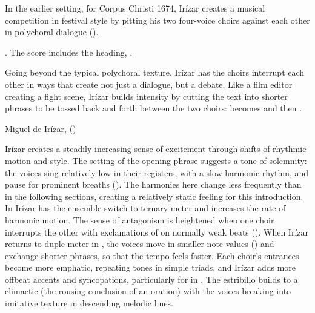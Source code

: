 In the earlier setting, for Corpus Christi 1674, Irízar creates a musical
competition in festival style by pitting his two four-voice choirs against each
other in polychoral dialogue ().%
\begin{Footnote}
    \Autocite[133--148]{Cashner:WLSCM32}.  
    The score includes the heading, .
\end{Footnote}
Going beyond the typical polychoral texture, Irízar has the choirs interrupt
each other in ways that create not just a dialogue, but a debate.
Like a film editor creating a fight scene, Irízar builds intensity by cutting
the text into shorter phrases to be tossed back and forth between the two
choirs:  becomes  and then
.


\begin{musicexample}
    \caption{Miguel de Irízar,  ()}
    \label{mus:Irizar-Si_los_sentidos}
\end{musicexample}

Irízar creates a steadily increasing sense of excitement through shifts of
rhythmic motion and style.
The setting of the opening phrase suggests a tone of solemnity: the voices sing
relatively low in their registers, with a slow harmonic rhythm, and pause for
prominent breaths ().
The harmonies here change less frequently than in the following sections,
creating a relatively static feeling for this introduction.
In  Irízar has the ensemble switch to ternary meter and increases
the rate of harmonic motion.
The sense of antagonism is heightened when one choir interrupts the other with
exclamations of  on normally weak beats ().
When Irízar returns to duple meter in , the voices move in smaller
note values () and exchange shorter phrases, so that the tempo
feels faster.
Each choir's entrances become more emphatic, repeating tones in simple triads,
and Irízar adds more offbeat accents and syncopations, particularly for
 in .
The estribillo builds to a climactic  (the rousing conclusion of
an oration) with the voices breaking into imitative texture in descending
melodic lines.

